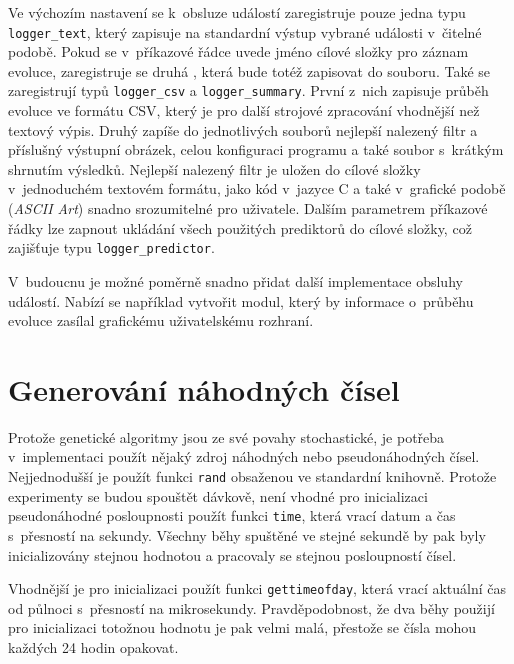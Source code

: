 Ve výchozím nastavení se k~obsluze událostí zaregistruje pouze jedna  typu \texttt{logger\_text}, který zapisuje na standardní výstup vybrané události v~čitelné podobě. Pokud se v~příkazové řádce uvede jméno cílové složky pro záznam evoluce, zaregistruje se druhá , která bude totéž zapisovat do souboru. Také se zaregistrují  typů \texttt{logger\_csv} a \texttt{logger\_summary}. První z~nich zapisuje průběh evoluce ve formátu CSV, který je pro další strojové zpracování vhodnější než textový výpis. Druhý zapíše do jednotlivých souborů nejlepší nalezený filtr a příslušný výstupní obrázek, celou konfiguraci programu a také soubor s~krátkým shrnutím výsledků. Nejlepší nalezený filtr je uložen do cílové složky v~jednoduchém textovém formátu, jako kód v~jazyce C a také v~grafické podobě (\emph{ASCII Art}) snadno srozumitelné pro uživatele. Dalším parametrem příkazové řádky lze zapnout ukládání všech použitých prediktorů do cílové složky, což zajišťuje  typu \texttt{logger\_predictor}.

V~budoucnu je možné poměrně snadno přidat další implementace obsluhy událostí. Nabízí se například vytvořit modul, který by informace o~průběhu evoluce zasílal grafickému uživatelskému rozhraní.

\section{Generování náhodných čísel}

Protože genetické algoritmy jsou ze své povahy stochastické, je potřeba v~implementaci použít nějaký zdroj náhodných nebo pseudonáhodných čísel. Nejjednodušší je použít funkci \texttt{rand} obsaženou ve standardní knihovně. Protože experimenty se budou spouštět dávkově, není vhodné pro inicializaci pseudonáhodné posloupnosti použít funkci \texttt{time}, která vrací datum a čas s~přesností na sekundy. Všechny běhy spuštěné ve stejné sekundě by pak byly inicializovány stejnou hodnotou a pracovaly se stejnou posloupností čísel.

Vhodnější je pro inicializaci použít funkci \texttt{gettimeofday}, která vrací aktuální čas od půlnoci s~přesností na mikrosekundy. Pravděpodobnost, že dva běhy použijí pro inicializaci totožnou hodnotu je pak velmi malá, přestože se čísla mohou každých 24 hodin opakovat.

%



